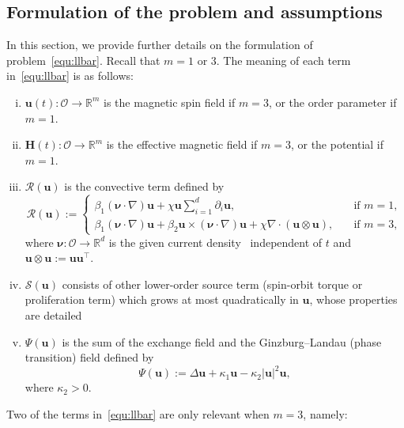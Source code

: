 \documentclass[11pt, reqno]{amsart}
\theoremstyle{definition}
\numberwithin{equation}{section}
\newcommand{\bff}{\boldsymbol}
\newcommand{\bb}{\mathbb}
\newcommand{\bl}[1]{{\color{blue}{#1}}}
\begin{document}
\subsection{Formulation of the problem and assumptions}\label{subsec:assum}
In this section, we provide further details on the formulation of problem~\eqref{equ:llbar}. Recall that $m=1$ or $3$.
The meaning of each term in~\eqref{equ:llbar} is as follows:
\begin{enumerate}[(i)]
	\item $\bff{u}(t): \mathscr{O} \to \bb{R}^m$ is the magnetic spin field if $m=3$, or the order parameter if $m=1$.
	\item $\bff{H}(t):\mathscr{O} \to \bb{R}^m$ is the effective magnetic field if $m=3$, or the potential if $m=1$.
	\item $\mathcal{R}(\bff{u})$ is the convective term defined by 
	\begin{equation}\label{equ:R u}
    \mathcal{R}(\bff{u}):=
	\begin{cases}
		\beta_1(\bff{\nu}\cdot \nabla)\bff{u}
        +
        \chi \bff{u}  \sum_{i=1}^d \partial_i \bff{u}, \quad &\text{if } m=1,
		\\
		\beta_1(\bff{\nu}\cdot \nabla)\bff{u}
	+ \beta_2 \bff{u} \times (\bff{\nu}\cdot\nabla)\bff{u} + \chi \nabla\cdot (\bff{u}\otimes \bff{u}), \quad &\text{if } m=3,
	\end{cases} 
    \end{equation}
	where $\bff{\nu}: \mathscr{O} \to \bb{R}^d$ is the given current density~\cite{EdeKal07, GolDavNep98, ThiNakMilSuz05} independent of $t$ and $\bff{u}\otimes\bff{u}:= \bff{u}\bff{u}^\top$.
	\item $\mathcal{S}(\bff{u})$ consists of other lower-order source term (spin-orbit torque or proliferation term) which grows at most quadratically in $\bff{u}$, whose properties are detailed \bl{in~\eqref{equ:S u}--\eqref{equ:S u min v}.}
	\item $\Psi(\bff{u})$ is the sum of the exchange field and the Ginzburg--Landau (phase transition) field defined by
 	\begin{equation}\label{equ:Psi u}
    \Psi(\bff{u}):= \Delta \bff{u}+ \kappa_1 \bff{u}- \kappa_2 |\bff{u}|^2 \bff{u},
    \end{equation}
    where $\kappa_2>0$.
\end{enumerate}
    Two of the terms in~\eqref{equ:llbar} are only relevant when $m=3$, namely:
\end{document}
